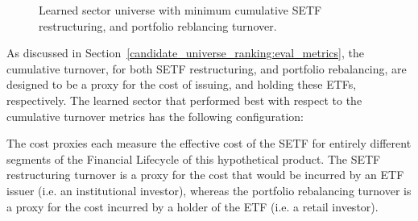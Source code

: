\documentclass[../main.tex]{subfiles}
\begin{document}
\begin{figure}
    \centering
    \vspace{\wrapfigadjustment}
    \caption{Learned sector universe with minimum cumulative SETF restructuring, and portfolio reblancing turnover.}
    \label{fig:optimal_sector_universe:minimum_turnover}
\end{figure}

As discussed in Section~\ref{candidate_universe_ranking:eval_metrics}, the cumulative turnover, for both SETF restructuring, and portfolio rebalancing, are designed to be a proxy for the cost of issuing, and holding these ETFs, respectively. The learned sector that performed best with respect to the cumulative turnover metrics has the following configuration:

\begin{minipage}{\linewidth}
    \centering
    \bfseries
\end{minipage}

The cost proxies each measure the effective cost of the SETF for entirely different segments of the Financial Lifecycle of this hypothetical product. The SETF restructuring turnover is a proxy for the cost that would be incurred by an ETF issuer (i.e. an institutional investor), whereas the portfolio rebalancing turnover is a proxy for the cost incurred by a holder of the ETF (i.e. a retail investor).
\end{document}
